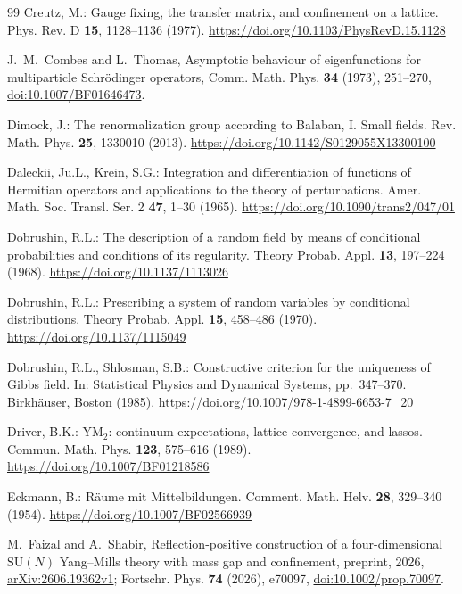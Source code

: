 \documentclass[11pt]{amsart}
\theoremstyle{definition}
\theoremstyle{remark}
\numberwithin{equation}{section}
\newcommand{\SU}{\mathrm{SU}}
\begin{document}
\begin{thebibliography}{99}
Creutz, M.: Gauge fixing, the transfer matrix, and confinement on a
lattice. Phys. Rev. D \textbf{15}, 1128--1136 (1977).
\href{https://doi.org/10.1103/PhysRevD.15.1128}{https://doi.org/10.1103/PhysRevD.15.1128}

J.~M.~Combes and L.~Thomas, Asymptotic behaviour of eigenfunctions for
multiparticle Schr\"odinger operators, Comm. Math. Phys. \textbf{34} (1973),
251--270,
\href{https://doi.org/10.1007/BF01646473}{doi:10.1007/BF01646473}.

Dimock, J.: The renormalization group according to Balaban, I. Small fields. Rev. Math. Phys. \textbf{25}, 1330010 (2013). \href{https://doi.org/10.1142/S0129055X13300100}{https://doi.org/10.1142/S0129055X13300100}

Daleckii, Ju.L., Krein, S.G.: Integration and differentiation of functions of
Hermitian operators and applications to the theory of perturbations. Amer.
Math. Soc. Transl. Ser. 2 \textbf{47}, 1--30 (1965). \href{https://doi.org/10.1090/trans2/047/01}{https://doi.org/10.1090/trans2/047/01}

Dobrushin, R.L.: The description of a random field by means of conditional
probabilities and conditions of its regularity. Theory Probab. Appl.
\textbf{13}, 197--224 (1968).
\href{https://doi.org/10.1137/1113026}{https://doi.org/10.1137/1113026}

Dobrushin, R.L.: Prescribing a system of random variables by conditional
distributions. Theory Probab. Appl. \textbf{15}, 458--486 (1970).
\href{https://doi.org/10.1137/1115049}{https://doi.org/10.1137/1115049}

Dobrushin, R.L., Shlosman, S.B.: Constructive criterion for the uniqueness
of Gibbs field. In: Statistical Physics and Dynamical Systems,
pp.~347--370. Birkh\"auser, Boston (1985).
\href{https://doi.org/10.1007/978-1-4899-6653-7_20}{https://doi.org/10.1007/978-1-4899-6653-7\_20}

Driver, B.K.: YM$_2$: continuum expectations, lattice convergence, and lassos. Commun. Math. Phys. \textbf{123}, 575--616 (1989). \href{https://doi.org/10.1007/BF01218586}{https://doi.org/10.1007/BF01218586}

Eckmann, B.: R{\"a}ume mit Mittelbildungen. Comment. Math. Helv.
\textbf{28}, 329--340 (1954).
\href{https://doi.org/10.1007/BF02566939}{https://doi.org/10.1007/BF02566939}

M.~Faizal and A.~Shabir, Reflection-positive construction of a
four-dimensional $\SU(N)$ Yang--Mills theory with mass gap and confinement,
preprint, 2026, \href{https://arxiv.org/abs/2606.19362v1}{arXiv:2606.19362v1};
Fortschr. Phys. \textbf{74} (2026), e70097,
\href{https://doi.org/10.1002/prop.70097}{doi:10.1002/prop.70097}.


\end{thebibliography}
\end{document}
